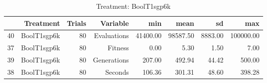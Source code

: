 \begin{table}[ht]
\centering
\begin{tabular}{rrrrrrrr}
  \hline
 & Treatment & Trials & Variable & min & mean & sd & max \\ 
  \hline
40 & BoolT1sgp6k &  80 & Evaluations & 41400.00 & 98587.50 & 8883.00 & 100000.00 \\ 
  37 & BoolT1sgp6k &  80 & Fitness & 0.00 & 5.30 & 1.50 & 7.00 \\ 
  39 & BoolT1sgp6k &  80 & Generations & 207.00 & 492.94 & 44.42 & 500.00 \\ 
  38 & BoolT1sgp6k &  80 & Seconds & 106.36 & 301.31 & 48.60 & 398.28 \\ 
   \hline
\end{tabular}
\caption{Treatment: BoolT1sgp6k} 
\end{table}
